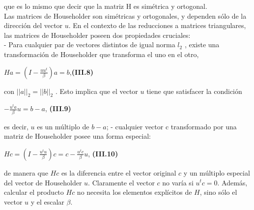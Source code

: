 \documentclass[twocolumn,twoside]{article}
\begin{document}
que es lo mismo que decir que la matriz H es sim\'etrica y ortogonal.\\
Las matrices de Householder son sim\'etricas y ortogonales, y dependen s\'olo
de la direcci\'on del vector $u$.
En el contexto de las reducciones a matrices triangulares, las matrices de Householder
poseen dos propiedades cruciales:\\
- Para cualquier par de vectores distintos de igual norma $l_2$ , existe una transformaci\'on de
Householder que transforma el uno en el otro,
\begin{center}
  $H a = (I - \frac{uu^t}{\beta})a=b$,\hspace{1cm}\textbf{(III.8)}
\end{center}
con $||a||_2 = ||b||_2$ . Esto implica que el vector $u$ tiene que satisfacer la condici\'on
\begin{center}
  $-\frac{u^t a }{\beta}u = b - a$, \hspace{1.5cm}\textbf{(III.9)}
\end{center}
es decir, $u$ es un m\'ultiplo de $b-a$;
- cualquier vector c transformado por una matriz de Householder posee una forma especial:
\begin{center}
  $Hc=(I-\frac{u^t u }{\beta})c = c-\frac{u^tc}{\beta}u$, \hspace{1cm}\textbf{(III.10)}
\end{center}
de manera que $H c$ es la diferencia entre el vector original $c$ y un m\'ultiplo especial del
vector de Householder $u$.
Claramente el vector $c$ no var\'ia si $u^t c = 0$. Adem\'as, calcular el producto $H c$ no necesita
los elementos expl\'icitos de $H$, sino s\'olo el vector $u$ y el escalar $\beta$.
\end{document}
